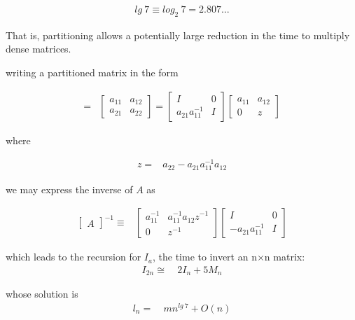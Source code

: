 \begin{align*}
    lg\ 7 \equiv log_{2}\ 7 = 2.807...
\end{align*}

That is, partitioning allows a potentially large reduction in the time to multiply dense matrices.

 writing a partitioned matrix in the form

\begin{align}
    [A]                     =& 
    \begin{bmatrix}
      a_{11} & a_{12} \\
      a_{21} & a_{22}
    \end{bmatrix}
    =
    \begin{bmatrix}
      I                 & 0 \\
      a_{21}^{}a_{11}^{-1} & I
    \end{bmatrix}
    \begin{bmatrix}
      a_{11} & a_{12} \\
      0      & z
    \end{bmatrix}
\end{align}

where

\begin{align}
    z =& a_{22} - a_{21}a_{11}^{-1}a_{12}
\end{align}

we may express the inverse of $A$ as

\begin{align}
    \begin{bmatrix}
      A
    \end{bmatrix}^{-1} \equiv&
    \begin{bmatrix}
      a_{11}^{-1} & a_{11}^{-1}a_{12}^{}z^{-1} \\
      0           & z^{-1}
    \end{bmatrix}
    \begin{bmatrix}
      I                     & 0 \\
      -a_{21}^{}a_{11}^{-1} & I
    \end{bmatrix}
\end{align}

which leads to the recursion for $I_{a}$, the time to invert an n$\times$n matrix:
\begin{align}
I_{2n} \cong&\ 2I_{n} + 5M_{n}
\end{align} 

whose solution is
\begin{align}
l_{n} =&\ mn^{lg\ 7} + O(n)
\end{align}

